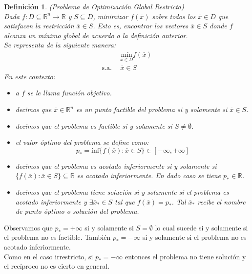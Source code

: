 \documentclass[11pt]{report}
\newtheorem{definition}{Definición}[section]
\newcommand{\Rn}{\mathbb{R}^{n}}
\newcommand{\R}{\mathbb{R}}
\newcommand{\x}{\overline{x}}
\newcommand{\po}{p_{*}}
\newcommand{\xo}{\overline{x}_{*}}
\begin{document}
\begin{definition}{(Problema de Optimización Global Restricta)}\\
Dada $f:D\subseteq\Rn\rightarrow\R$ y $S\subseteq D$, minimizar $f(\x)$ sobre todos los $\x\in D$ que satisfacen la restricción $\x\in S$. Esto es, encontrar los vectores $\x \in S$ donde $f$ alcanza un mínimo global de acuerdo a la definición anterior.\\
Se representa de la siguiente manera:
\begin{equation*}
\begin{aligned}
& \underset{\x\in D}{\text{mín}} f(\x) \\
\text{s.a.}\ \
& \x\in S
\end{aligned}
\end{equation*}
En este contexto:
\begin{itemize}
\item[(i)] a $f$ se le llama \emph{función objetivo}.
\item[(ii)] decimos que $\x\in\Rn$ es un punto factible del problema si y solamente si $\x\in S$.
\item[(iii)] decimos que el problema es factible si y solamente si $S\ne\emptyset$.
\item[(iv)] el \emph{valor óptimo} del problema  se define como:
$$\po=\text{ínf}\{f(\x):\x\in S\}\in[-\infty, +\infty]$$
\item[(v)] decimos que \emph{el problema es acotado inferiormente} si y solamente si $\{f(\x):\x\in S\}\subseteq\R$ es acotado inferiormente. En dado caso se tiene $\po\in\R$.
\item[(vi)] decimos que \emph{el problema tiene solución} si y solamente si el problema es acotado inferiormente y $\exists\xo\in S$ tal que $f(\x)=\po$. Tal $\xo$ recibe el nombre de \emph{punto óptimo} o \emph{solución del problema}.
\end{itemize}
\end{definition}

Observamos que $\po=+\infty$ si y solamente si $S=\emptyset$ lo cual sucede si y solamente si el problema no es factible. También $\po=-\infty$ si y solamente si el problema no es acotado inferiormente.\\

 Como en el caso irrestricto, si $\po=-\infty$ entonces el problema no tiene solución y el recíproco no es cierto en general.
\end{document}
